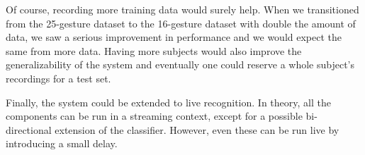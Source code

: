 Of course, recording more training data would surely help. When we transitioned
from the 25-gesture dataset to the 16-gesture dataset with double the amount of
data, we saw a serious improvement in performance and we would expect the same
from more data. Having more subjects would also improve the generalizability of
the system and eventually one could reserve a whole subject's recordings for a
test set.

Finally, the system could be extended to live recognition. In theory, all the
components can be run in a streaming context, except for a possible
bi-directional extension of the classifier. However, even these can be run live
by introducing a small delay.
